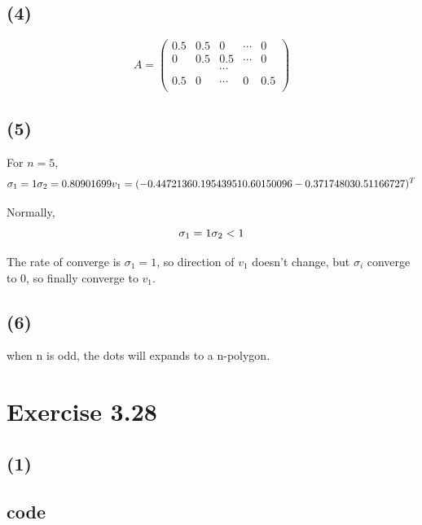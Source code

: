 \documentclass[a4paper, 11pt]{article}
\begin{document}
\subsection*{(4)}

$$A = \begin{pmatrix}
    0.5 & 0.5 & 0 & \cdots & 0 \\
    0 & 0.5 & 0.5 & \cdots & 0 \\
    &&\cdots && \\
    0.5 & 0 & \cdots & 0 & 0.5 \\
\end{pmatrix}$$

\subsection*{(5)}
For $n = 5$, 
$$
\sigma_1 = 1 \\
\sigma_2 = 0.80901699 \\
v_1 = (-0.4472136   0.19543951  0.60150096 -0.37174803  0.51166727)^T \\
$$

Normally, 
$$
\sigma_1 = 1 \\
\sigma_2 < 1 \\
$$

The rate of converge is $\sigma_1 = 1$, so direction of $v_1$ doesn't change, 
but $\sigma_i$ converge to $0$, so finally converge to $v_1$.


\subsection*{(6)}

when n is odd, the dots will expands to a n-polygon.



\section*{Exercise 3.28}

\subsection*{(1)}

\subsection*{code}
\end{document}
